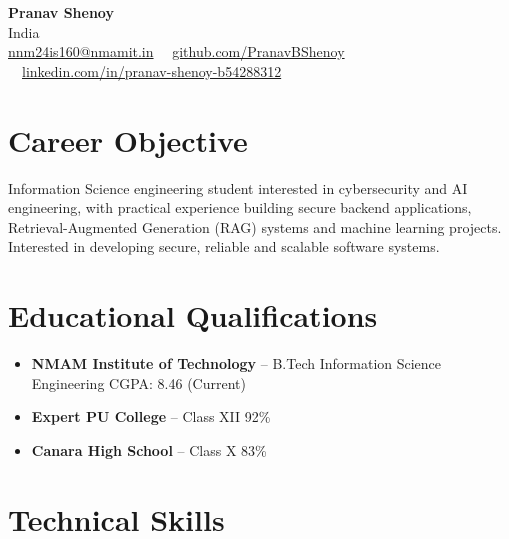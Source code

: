 \documentclass[10pt,a4paper]{article}
\begin{document}
\begin{center}
    {\LARGE \textbf{Pranav Shenoy}} \\ \vspace{4pt}
    India \\
    \href{mailto:nnm24is160@nmamit.in}{nnm24is160@nmamit.in}
    \ \textbar \
    \href{https://github.com/PranavBShenoy}{github.com/PranavBShenoy}
    \ \textbar \
    \href{https://linkedin.com/in/pranav-shenoy-b54288312}
    {linkedin.com/in/pranav-shenoy-b54288312}
\end{center}

\section*{Career Objective}

Information Science engineering student interested in
cybersecurity and AI engineering, with practical experience
building secure backend applications, Retrieval-Augmented
Generation (RAG) systems and machine learning projects.
Interested in developing secure, reliable and scalable
software systems.

\section*{Educational Qualifications}

\begin{itemize}
    \item \textbf{NMAM Institute of Technology}
    -- B.Tech Information Science Engineering
    \hfill CGPA: 8.46 (Current)

    \item \textbf{Expert PU College}
    -- Class XII
    \hfill 92\%

    \item \textbf{Canara High School}
    -- Class X
    \hfill 83\%
\end{itemize}

\section*{Technical Skills}
\end{document}

